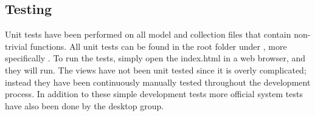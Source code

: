 \subsection{Testing}
Unit tests have been performed on all model and collection files that contain non-trivial functions. All unit tests can be found in the root folder under , more specifically . To run the tests, simply open the index.html in a web browser, and they will run. The views have not been unit tested since it is overly complicated; instead they have been continuously manually tested throughout the development process. In addition to these simple development tests more official system tests have also been done by the desktop group.
